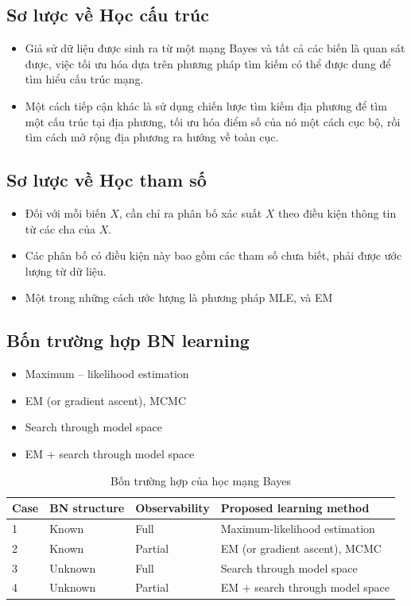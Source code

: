 \documentclass[12pt]{report}
\begin{document}
\subsection{Sơ lược về Học cấu trúc}
\begin{itemize}
\item Giả sử dữ liệu được sinh ra từ một mạng Bayes và tất cả các biến là quan sát được, việc tối ưu hóa dựa trên phương pháp tìm kiếm có thể được dung để tìm hiểu cấu trúc mạng. 
\item Một cách tiếp cận khác là sử dụng chiến lược tìm kiếm địa phương để tìm một cấu trúc tại địa phương, tối ưu hóa điểm số của nó một cách cục bộ, rồi tìm cách mở rộng địa phương ra hướng về toàn cục.
\end{itemize}
\subsection{Sơ lược về Học tham số}
\begin{itemize}
\item Đối với mỗi biến $X$, cần chỉ ra phân bố xác suất $X$ theo điều kiện thông tin từ các cha của $X$.
\item Các phân bố có điều kiện này bao gồm các tham số chưa biết, phải được ước lượng từ dữ liệu.
\item Một trong những cách ước lượng là phương pháp MLE, và EM
\end{itemize}
\subsection{Bốn trường hợp BN learning}
\begin{itemize}
\item Maximum – likelihood estimation
\item EM (or gradient ascent), MCMC
\item Search through model space
\item EM + search through model space
\end{itemize}

\begin{table}[h]
\caption{Bốn trường hợp của học mạng Bayes}
\centering
\begin{tabular}{|l|l|l|l|}
\hline
Case & BN structure & Observability & Proposed learning method \\
\hline 
1 & Known & Full & Maximum-likelihood estimation			\\
2 & Known & Partial & EM (or gradient ascent), MCMC \\
3 & Unknown & Full & Search through model space \\
4 & Unknown & Partial & EM + search through model space \\
\hline
\end{tabular}
\end{table}
\end{document}
